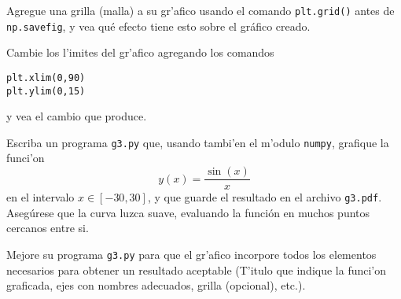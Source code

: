\documentclass[11pt]{exam}
\begin{document}
\begin{questions}
\item Agregue una grilla (malla) a su gr'afico usando el comando \texttt{plt.grid()} antes de \texttt{np.savefig}, y vea qué efecto tiene esto sobre el gráfico creado.
\item Cambie los l'imites del gr'afico agregando los comandos

\begin{verbatim}
plt.xlim(0,90)
plt.ylim(0,15)
\end{verbatim}

y vea el cambio que produce.

\item Escriba un programa \texttt{g3.py} que, usando tambi'en el m'odulo \texttt{numpy}, grafique la funci'on 
\begin{equation}
y(x)=\frac{\sin(x)}{x}
\end{equation}
en el intervalo $x\in[-30,30]$, y que guarde el resultado en el archivo \texttt{g3.pdf}. Asegúrese que la curva luzca suave, evaluando la función en muchos puntos cercanos entre si.

\item Mejore su programa \texttt{g3.py} para que el gr'afico incorpore todos los elementos necesarios para obtener un resultado aceptable (T'itulo que indique la funci'on graficada, ejes con nombres adecuados, grilla (opcional), etc.).


\end{questions}
\end{document}
